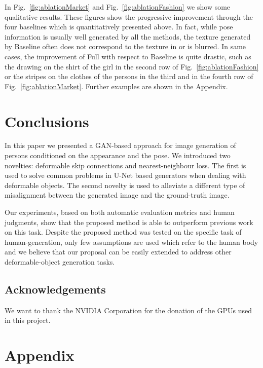 \documentclass[10pt,twocolumn,letterpaper]{article}
\begin{document}
In Fig.~\ref{fig:ablationMarket} and Fig.~\ref{fig:ablationFashion} we show some qualitative results.
These figures show the progressive improvement through the four baselines which is quantitatively presented above.
In fact, while pose information is usually well generated by all the methods, 
the texture generated by Baseline often does not correspond to the texture in  or is blurred. In same cases, the improvement of Full with respect to Baseline is quite drastic, such as the drawing on the shirt of the girl in the second row of Fig.~\ref{fig:ablationFashion} or 
the stripes on the clothes of the persons in the third and in the fourth row of Fig.~\ref{fig:ablationMarket}. Further examples are shown in the Appendix.






 

\section{Conclusions}
In this paper we presented a GAN-based approach for image generation of persons conditioned on the appearance and  the pose. We introduced two novelties: deformable skip connections and nearest-neighbour loss. The first is used to solve common problems in U-Net based generators when dealing with deformable objects. 
The second novelty is used to alleviate a different type of misalignment between the generated image and the ground-truth image.

Our experiments, based on both automatic evaluation metrics and human judgments,
show that the proposed method is able to outperform previous work on this task.
Despite the proposed method was tested on the specific task of human-generation, only few assumptions are used which refer to the human body and we believe that our proposal can be easily extended to address other deformable-object generation tasks.


\subsection*{Acknowledgements}
We want to thank the NVIDIA Corporation for the  donation  of  the  GPUs  used  in this project.






{\small


}
\clearpage

\appendix
\section*{Appendix}
\label{Appendix}
\end{document}

